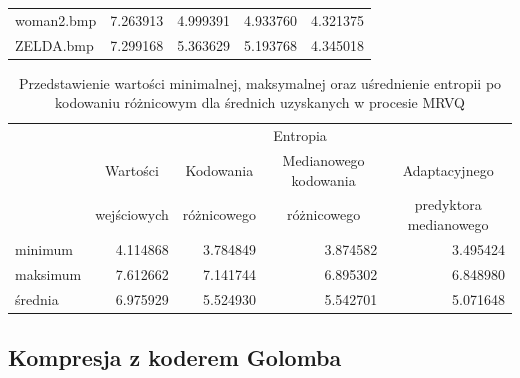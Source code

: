 \documentclass{article}
\begin{document}
\begin{table}[H]
\begin{adjustbox}{center}
\begin{tabular}{lrrrr}
    woman2.bmp         & 7.263913                     & 4.999391                               & 4.933760                                  & 4.321375                                   \\
    ZELDA.bmp          & 7.299168                     & 5.363629                               & 5.193768                                  & 4.345018                                   \\
    \bottomrule
  \end{tabular}
\end{adjustbox}
\end{table}

\begin{table}[H]
  \caption{Przedstawienie wartości minimalnej, maksymalnej oraz uśrednienie entropii po kodowaniu różnicowym dla średnich uzyskanych w procesie MRVQ}
  \label{tab:differential_encoding_summary}
  \centering
  \begin{tabular}{lrrrr}
    \toprule
    {}                 & \multicolumn{4}{c}{Entropia} \\
    \cmidrule(lr){2-5}
    {}            & \multicolumn{1}{c}{Wartości} & \multicolumn{1}{c}{Kodowania} & \multicolumn{1}{c}{Medianowego kodowania}  & \multicolumn{1}{c}{Adaptacyjnego} \\
    {}                 & \multicolumn{1}{c}{wejściowych} & \multicolumn{1}{c}{różnicowego}        & \multicolumn{1}{c}{różnicowego} & \multicolumn{1}{c}{predyktora medianowego} \\
    \midrule
    minimum  & 4.114868                     & 3.784849                               & 3.874582                                  & 3.495424                                   \\
    maksimum & 7.612662                     & 7.141744                               & 6.895302                                  & 6.848980                                   \\
    średnia  & 6.975929                     & 5.524930                               & 5.542701                                  & 5.071648                                   \\
    \bottomrule
  \end{tabular}
\end{table}

\subsection{Kompresja z koderem Golomba}
\end{document}
